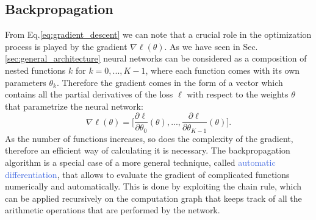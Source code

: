 \subsection{Backpropagation}
\label{sec:backprop}

From Eq.\ref{eq:gradient_descent} we can note that a crucial role in the optimization process is played by the gradient $\nabla\ell(\theta)$. As we have seen in Sec. \ref{sec:general_architecture} neural networks can be considered as a composition of nested functions $k$ for $k=0,...,K-1$, where each function comes with its own parameters $\theta_k$. Therefore the gradient comes in the form of a vector which contains all the partial derivatives of the loss $\ell$ with respect to the weights $\theta$ that parametrize the neural network:
\begin{equation}
	\nabla\ell(\theta) = \Big[\frac{\partial\ell}{\partial\theta_0}(\theta),...,\frac{\partial\ell}{\partial\theta_{K-1}}(\theta)\Big].
\end{equation}
As the number of functions increases, so does the complexity of the gradient, therefore an efficient way of calculating it is necessary. The backpropagation algorithm is a special case of a more general technique, called \textcolor{RoyalBlue}{automatic differentiation}, that allows to evaluate the gradient of complicated functions numerically and automatically. This is done by exploiting the chain rule, which can be applied recursively on the computation graph that keeps track of all the arithmetic operations that are performed by the network. 

